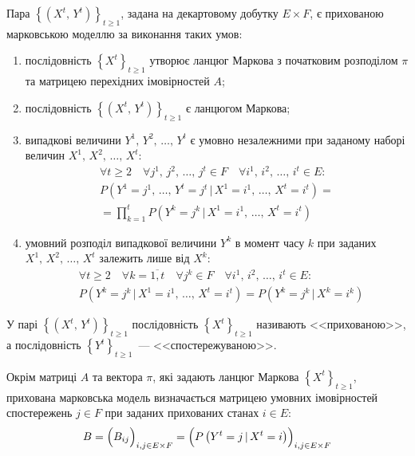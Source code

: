 \begin{definition}\label{def: HMM}
    Пара $\left\{\left( X^t,\,Y^t \right)\right\}_{t\geqslant 1}$, задана на декартовому добутку $E\times F$, є прихованою марковською моделлю за виконання таких умов:
    \begin{enumerate}
        \item послідовність $\left\{ X^t \right\}_{t\geqslant 1}$ утворює ланцюг Маркова з початковим розподілом $\pi$ та матрицею перехідних імовірностей $A$;
        \item послідовність $\left\{\left( X^t,\,Y^t \right)\right\}_{t\geqslant 1}$ є ланцюгом Маркова;
        \item випадкові величини $Y^1,\,Y^2,\,\ldots,\,Y^t$ є умовно незалежними при заданому наборі величин $X^1,\,X^2,\,\ldots,\,X^t:$
        \begin{multline*}
            \forall t\geqslant 2 \quad \forall j^1,\,j^2,\,\ldots,\,j^t \in F \quad \forall i^1,\,i^2,\,\ldots,\,i^t \in E: \\
            P\left( Y^1=j^1,\,\ldots,\,Y^t=j^t \,|\, X^1=i^1,\,\ldots,\,X^t=i^t \right) = \\
            = \prod\limits_{k=1}^{t}P\left( Y^k=j^k \,|\, X^1=i^1,\,\ldots,\,X^t=i^t \right)
        \end{multline*}
        \item умовний розподіл випадкової величини $Y^k$ в момент часу $k$ при заданих $X^1,\,X^2,\,\ldots,\,X^t$ залежить лише від $X^k:$
        \begin{align*}
            & \forall t\geqslant 2 \quad \forall k=\overline{1,t} \quad \forall j^k \in F \quad \forall i^1,\,i^2,\,\ldots,\,i^t \in E: \\
            & P\left( Y^k=j^k \,|\, X^1=i^1,\,\ldots,\,X^t=i^t \right) = P\left( Y^k=j^k \,|\, X^k=i^k \right)
        \end{align*}
    \end{enumerate}
\end{definition}

У парі $\left\{\left( X^t,\,Y^t \right)\right\}_{t\geqslant 1}$ послідовність $\left\{ X^t \right\}_{t\geqslant 1}$ називають <<прихованою>>, а послідовність $\left\{ Y^t \right\}_{t\geqslant 1}$~--- <<спостережуваною>>.

Окрім матриці $A$ та вектора $\pi$, які задають ланцюг Маркова $\left\{ X^t \right\}_{t\geqslant 1}$, прихована марковська модель визначається матрицею умовних імовірностей спостережень $j \in F$ при заданих прихованих станах $i \in E:$
\begin{equation*}
    B = \Bigl( B_{ij} \Bigr)_{i,j \in E \times F} = \Bigl( P\left( Y^{t}=j \,|\, X^{t}=i \right) \Bigr)_{i,j \in E \times F}
\end{equation*} 


